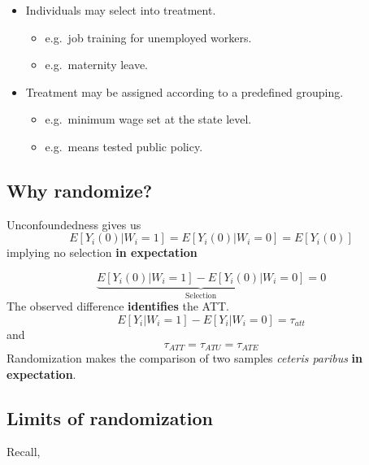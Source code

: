 \documentclass[
  letterpaper,
  DIV=11,
  numbers=noendperiod]{scrreprt}
\providecommand{\tightlist}{%
  \setlength{\itemsep}{0pt}\setlength{\parskip}{0pt}}\usepackage{longtable,booktabs,array}
\theoremstyle{definition}
\theoremstyle{remark}
\begin{document}
\begin{itemize}
\tightlist
\item
  Individuals may select into treatment.

  \begin{itemize}
  \tightlist
  \item
    e.g.~job training for unemployed workers.
  \item
    e.g.~maternity leave.
  \end{itemize}
\item
  Treatment may be assigned according to a predefined grouping.

  \begin{itemize}
  \tightlist
  \item
    e.g.~minimum wage set at the state level.
  \item
    e.g.~means tested public policy.
  \end{itemize}
\end{itemize}

\hypertarget{why-randomize-1}{%
\subsection{Why randomize?}\label{why-randomize-1}}

Unconfoundedness gives us \[
E\left[Y_i(0)|W_i=1\right]=E\left[Y_i(0)|W_i=0\right]=E\left[Y_i(0)\right]
\] implying no selection \textbf{in expectation}

\[
\underbrace{E\left[Y_i(0)|W_i=1\right]-E\left[Y_i(0)|W_i=0\right]}_\text{Selection}=0 
\] The observed difference \textbf{identifies} the ATT.
\begin{equation*}       
        E\left[Y_i|W_i=1\right]-E\left[Y_i|W_i=0\right]=\tau_{att} 
    \end{equation*} and \begin{equation*}
        \tau_{ATT}=\tau_{ATU}=\tau_{ATE}
    \end{equation*} Randomization makes the comparison of two samples
\emph{ceteris paribus} \textbf{in expectation}.

\hypertarget{limits-of-randomization}{%
\subsection{Limits of randomization}\label{limits-of-randomization}}

Recall,

\par
\end{document}
